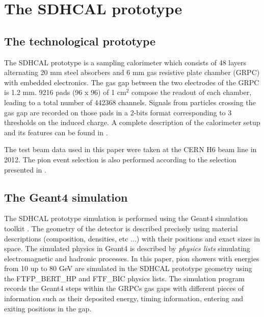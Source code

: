 \documentclass[cits]{JINST}
\begin{document}
\section{The SDHCAL prototype}

\subsection{The technological prototype}

The SDHCAL prototype is a sampling calorimeter which consists of 48 layers alternating 20 mm steel absorbers and 6 mm gas resistive plate chamber (GRPC) with embedded electronics. The gas gap between the two electrodes of the GRPC is 1.2 mm. 9216 pads (96 x 96) of 1 cm$^2$ compose the readout of each chamber, leading to a total number of 442368 channels. Signals from particles crossing the gas gap are recorded on those pads in a 2-bits format corresponding to 3 thresholds on the induced charge. A complete description of the calorimeter setup and its features can be found in \cite{sdhcal-paper}. 

The test beam data used in this paper were taken at the CERN H6 beam line in 2012. The pion event selection is also performed according to the selection presented in \cite{sdhcal-paper}.

\subsection{The Geant4 simulation}

The SDHCAL prototype simulation is performed using the Geant4 simulation toolkit \cite{geant4}. The geometry of the detector is described precisely using material descriptions (composition, densities, etc ...) with their positions and exact sizes in space. The simulated physics in Geant4 is described by \emph{physics lists} simulating electromagnetic and hadronic processes. In this paper, pion showers with energies from 10 up to 80 GeV are simulated in the SDHCAL prototype geometry using the FTFP\_BERT\_HP and FTF\_BIC physics lists. The simulation program records the Geant4 steps within the GRPCs gas gaps with different pieces of information such as their deposited energy, timing information, entering and exiting positions in the gap.
\end{document}
